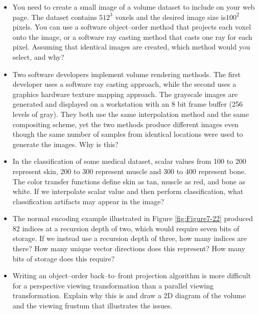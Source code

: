 \begin{itemize}
\item You need to create a small image of a volume dataset to include on your web page. The dataset contains $512^3$ voxels and the desired image size is$100^2$ pixels. You can use a software object--order method that projects each voxel onto the image, or a software ray casting method that casts one ray for each pixel. Assuming that identical images are created, which method would you select, and why?

\item Two software developers implement volume rendering methods. The first developer uses a software ray casting approach, while the second uses a graphics hardware texture mapping approach. The grayscale images are generated and displayed on a workstation with an 8 bit frame buffer (256 levels of gray). They both use the same interpolation method and the same compositing scheme, yet the two methods produce different images even though the same number of samples from identical locations were used to generate the images. Why is this?

\item In the classification of some medical dataset, scalar values from 100 to 200 represent skin, 200 to 300 represent muscle and 300 to 400 represent bone. The color transfer functions define skin as tan, muscle as red, and bone as white. If we interpolate scalar value and then perform classification, what classification artifacts may appear in the image?

\item The normal encoding example illustrated in Figure \ref{fig:Figure7-22} produced 82 indices at a recursion depth of two, which would require seven bits of storage. If we instead use a recursion depth of three, how many indices are there? How many unique vector directions does this represent? How many bits of storage does this require?

\item Writing an object--order back--to--front projection algorithm is more difficult for a perspective viewing transformation than a parallel viewing transformation. Explain why this is and draw a 2D diagram of the volume and the viewing frustum that illustrates the issues.

\end{itemize}

